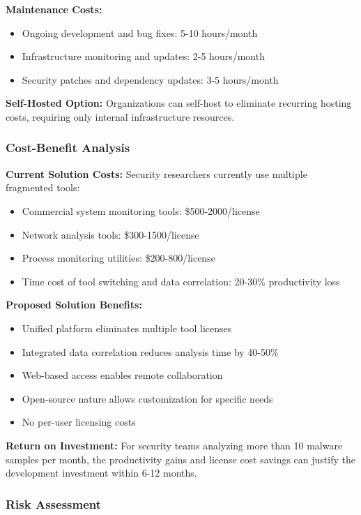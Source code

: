 \textbf{Maintenance Costs:}
\begin{itemize}
    \item Ongoing development and bug fixes: 5-10 hours/month
    \item Infrastructure monitoring and updates: 2-5 hours/month
    \item Security patches and dependency updates: 3-5 hours/month
\end{itemize}

\textbf{Self-Hosted Option:} Organizations can self-host to eliminate recurring hosting costs, requiring only internal infrastructure resources.

\subsubsection{Cost-Benefit Analysis}

\textbf{Current Solution Costs:} Security researchers currently use multiple fragmented tools:
\begin{itemize}
    \item Commercial system monitoring tools: \$500-2000/license
    \item Network analysis tools: \$300-1500/license
    \item Process monitoring utilities: \$200-800/license
    \item Time cost of tool switching and data correlation: 20-30\% productivity loss
\end{itemize}

\textbf{Proposed Solution Benefits:}
\begin{itemize}
    \item Unified platform eliminates multiple tool licenses
    \item Integrated data correlation reduces analysis time by 40-50\%
    \item Web-based access enables remote collaboration
    \item Open-source nature allows customization for specific needs
    \item No per-user licensing costs
\end{itemize}

\textbf{Return on Investment:} For security teams analyzing more than 10 malware samples per month, the productivity gains and license cost savings can justify the development investment within 6-12 months.

\subsubsection{Risk Assessment}


